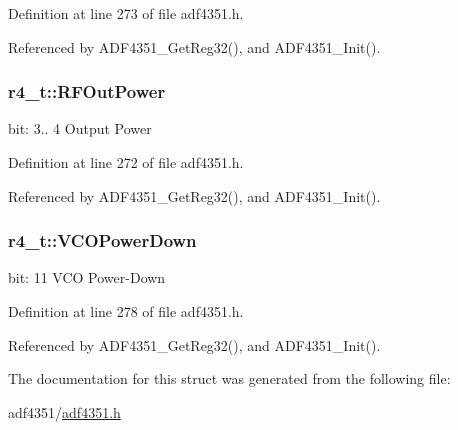 Definition at line 273 of file adf4351.\+h.



Referenced by A\+D\+F4351\+\_\+\+Get\+Reg32(), and A\+D\+F4351\+\_\+\+Init().

\subsubsection[{\texorpdfstring{R\+F\+Out\+Power}{RFOutPower}}]{ r4\+\_\+t\+::\+R\+F\+Out\+Power}\hypertarget{structr4__t_ade4ee7f86064dd89515558dc5aa138bd}{}\label{structr4__t_ade4ee7f86064dd89515558dc5aa138bd}
bit\+: 3.. 4 Output Power 

Definition at line 272 of file adf4351.\+h.



Referenced by A\+D\+F4351\+\_\+\+Get\+Reg32(), and A\+D\+F4351\+\_\+\+Init().

\subsubsection[{\texorpdfstring{V\+C\+O\+Power\+Down}{VCOPowerDown}}]{ r4\+\_\+t\+::\+V\+C\+O\+Power\+Down}\hypertarget{structr4__t_a144b348686f74ef9a401f2c57f324824}{}\label{structr4__t_a144b348686f74ef9a401f2c57f324824}
bit\+: 11 V\+CO Power-\/\+Down 

Definition at line 278 of file adf4351.\+h.



Referenced by A\+D\+F4351\+\_\+\+Get\+Reg32(), and A\+D\+F4351\+\_\+\+Init().



The documentation for this struct was generated from the following file\+:\begin{DoxyCompactItemize}
\item 
adf4351/\hyperlink{adf4351_8h}{adf4351.\+h}\end{DoxyCompactItemize}
